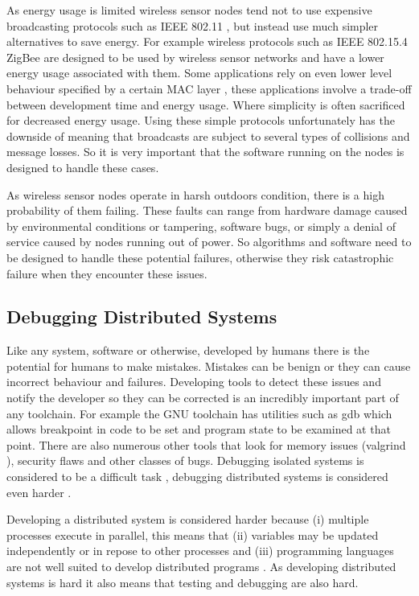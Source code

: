 As energy usage is limited wireless sensor nodes tend not to use expensive broadcasting protocols such as IEEE 802.11 \cite{Mica2002}, but instead use much simpler alternatives to save energy. For example wireless protocols such as IEEE 802.15.4 ZigBee \cite{1253873, 4014617} are designed to be used by wireless sensor networks and have a lower energy usage associated with them. Some applications rely on even lower level behaviour specified by a certain MAC layer \cite{5751321,4469515,?,BMAC,SMAC,XMAC}, these applications involve a trade-off between development time and energy usage. Where simplicity is often sacrificed for decreased energy usage. Using these simple protocols unfortunately has the downside of meaning that broadcasts are subject to several types of collisions and message losses. So it is very important that the software running on the nodes is designed to handle these cases.

As wireless sensor nodes operate in harsh outdoors condition, there is a high probability of them failing. These faults can range from hardware damage caused by environmental conditions or tampering, software bugs, or simply a denial of service caused by nodes running out of power. So algorithms and software need to be designed to handle these potential failures, otherwise they risk catastrophic failure when they encounter these issues.

\subsection{Debugging Distributed Systems}

Like any system, software or otherwise, developed by humans there is the potential for humans to make mistakes. Mistakes can be benign or they can cause incorrect behaviour and failures. Developing tools to detect these issues and notify the developer so they can be corrected is an incredibly important part of any toolchain. For example the GNU toolchain has utilities such as gdb \cite{?} which allows breakpoint in code to be set and program state to be examined at that point. There are also numerous other tools that look for memory issues (valgrind \cite{?}), security flaws \cite{?} and other classes of bugs. Debugging isolated systems is considered to be a difficult task \cite{?}, debugging distributed systems is considered even harder \cite{345131}.

Developing a distributed system is considered harder because (i) multiple processes execute in parallel, this means that (ii) variables may be updated independently or in repose to other processes and (iii) programming languages are not well suited to develop distributed programs \cite{93692,345131}. As developing distributed systems is hard it also means that testing and debugging are also hard.

